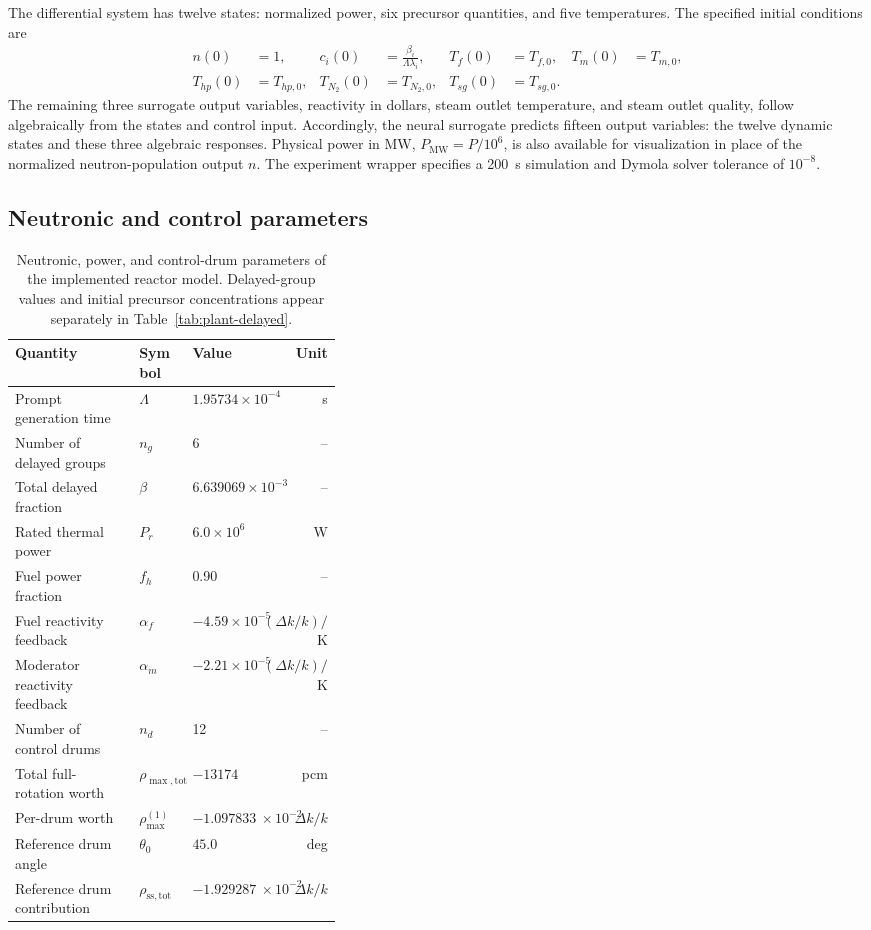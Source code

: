 The differential system has twelve states: normalized power, six precursor quantities, and five temperatures. The specified initial conditions are
\begin{align}
 n(0)&=1,&
 c_i(0)&=\frac{\beta_i}{\Lambda\lambda_i},&
 T_f(0)&=T_{f,0},&
 T_m(0)&=T_{m,0},\nonumber\\
 T_{hp}(0)&=T_{hp,0},&
 T_{N_2}(0)&=T_{N_2,0},&
 T_{sg}(0)&=T_{sg,0}.&
 \label{eq:app:initial}
\end{align}
The remaining three surrogate output variables, reactivity in dollars, steam outlet temperature, and steam outlet quality, follow algebraically from the states and control input. Accordingly, the neural surrogate predicts fifteen output variables: the twelve dynamic states and these three algebraic responses. Physical power in MW, $P_{\mathrm{MW}}=P/10^6$, is also available for visualization in place of the normalized neutron-population output $n$. The experiment wrapper specifies a 200~s simulation and Dymola solver tolerance of $10^{-8}$.

\subsection{Neutronic and control parameters}

\begin{table}[htbp]
\centering\small
\setlength{\tabcolsep}{4pt}
\caption{Neutronic, power, and control-drum parameters of the implemented reactor model. Delayed-group values and initial precursor concentrations appear separately in Table~\ref{tab:plant-delayed}.}
\label{tab:plant-neutronics}
\begin{tabular}{@{}p{0.38\linewidth}llr@{}}
\toprule
Quantity & Symbol & Value & Unit\\
\midrule
Prompt generation time & $\Lambda$ & $1.95734\times10^{-4}$ & s\\
Number of delayed groups & $n_g$ & 6 & --\\
Total delayed fraction & $\beta$ & $6.639069\times10^{-3}$ & --\\
Rated thermal power & $P_r$ & $6.0\times10^6$ & W\\
Fuel power fraction & $f_h$ & 0.90 & --\\
Fuel reactivity feedback & $\alpha_f$ & $-4.59\times10^{-5}$ & $(\Delta k/k)/$K\\
Moderator reactivity feedback & $\alpha_m$ & $-2.21\times10^{-5}$ & $(\Delta k/k)/$K\\
Number of control drums & $n_d$ & 12 & --\\
Total full-rotation worth & $\rho_{\max,\mathrm{tot}}$ & $-13174$ & pcm\\
Per-drum worth & $\rho_{\max}^{(1)}$ & $-1.0978333\times10^{-2}$ & $\Delta k/k$\\
Reference drum angle & $\theta_0$ & $45.0$ & deg\\
Reference drum contribution & $\rho_{\mathrm{ss,tot}}$ & $-1.9292876\times10^{-2}$ & $\Delta k/k$\\
\bottomrule
\end{tabular}
\end{table}

